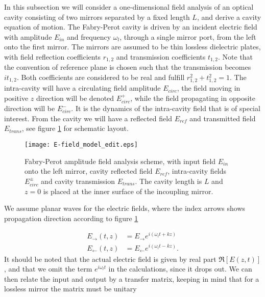 In this subsection we will consider a one-dimensional field analysis of an optical cavity consisting of two mirrors separated by a fixed length $L$, and derive a cavity equation of motion. The Fabry-Perot cavity is driven by an incident electric field with amplitude $E_{in}$ and frequency $\omega_l$, through a single mirror port, from the left onto the first mirror. The mirrors are assumed to be thin lossless dielectric plates, with field reflection coefficients $r_{1,2}$ and transmission coefficients $t_{1,2}$. Note that the convention of reference plane is chosen such that the transmission becomes $it_{1,2}$. Both coefficients are considered to be real and fulfill $r_{1,2}^2 + t_{1,2}^2 = 1$. The intra-cavity will have a circulating field amplitude $E_{circ}$, the field moving in positive $z$ direction will be denoted $E_{circ}^+$, while the field propagating in opposite direction will be $E_{circ}^-$. It is the dynamics of the intra-cavity field that is of special interest. From the cavity we will have a reflected field $E_{ref}$ and transmitted field $E_{trans}$, see figure \ref{fig:E-field_model} for schematic layout.

\begin{figure}[H]
\centering
\texttt{[image: E-field\_model\_edit.eps]}
\caption{Fabry-Perot amplitude field analysis scheme, with input field $E_{in}$ onto the left mirror, cavity reflected field $E_{ref}$, intra-cavity fields $E_{circ}^{\pm}$ and cavity transmission $E_{trans}$. The cavity length is $L$ and $z = 0$ is placed at the inner surface of the incoupling mirror.}
\label{fig:E-field_model}
\end{figure}

We assume planar waves for the electric fields, where the index arrows shows propagation direction according to figure \ref{fig:E-field_model}

\begin{align}
E_{\rightarrow}(t, z) & = E_{\rightarrow}e^{i(\omega_l t + kz)} \\
E_{\leftarrow}(t, z) & = E_{\leftarrow}e^{i(\omega_l t - kz)}.
\end{align}
\noindent
It should be noted that the actual electric field is given by real part $\Re[E(z, t)]$, and that we omit the term $e^{i\omega_l t}$ in the calculations, since it drops out. We can then relate the input and output by a transfer matrix, keeping in mind that for a lossless mirror the matrix must be unitary

